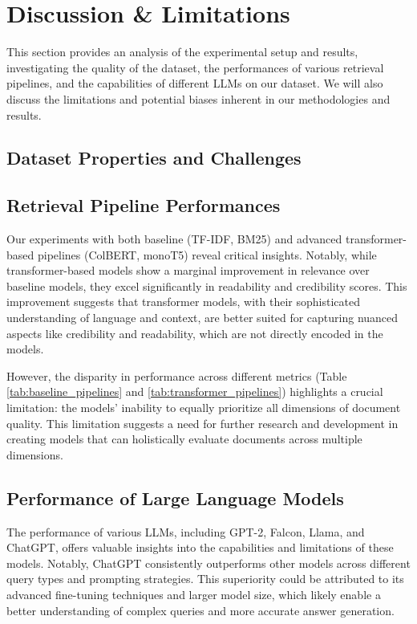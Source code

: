 \chapter{Discussion \& Limitations}

This section provides an analysis of the experimental setup and results, investigating the quality of the dataset, the performances of various retrieval pipelines, and the capabilities of different LLMs on our dataset.
We will also discuss the limitations and potential biases inherent in our methodologies and results.
\section{Dataset Properties and Challenges}

\section{Retrieval Pipeline Performances}
Our experiments with both baseline (TF-IDF, BM25) and advanced transformer-based pipelines (ColBERT, monoT5) reveal critical insights. Notably, while transformer-based models show a marginal improvement in relevance over baseline models, they excel significantly in readability and credibility scores. This improvement suggests that transformer models, with their sophisticated understanding of language and context, are better suited for capturing nuanced aspects like credibility and readability, which are not directly encoded in the models.

However, the disparity in performance across different metrics (Table \ref{tab:baseline_pipelines} and \ref{tab:transformer_pipelines}) highlights a crucial limitation: the models' inability to equally prioritize all dimensions of document quality. This limitation suggests a need for further research and development in creating models that can holistically evaluate documents across multiple dimensions.

\section{Performance of Large Language Models}
The performance of various LLMs, including GPT-2, Falcon, Llama, and ChatGPT, offers valuable insights into the capabilities and limitations of these models. Notably, ChatGPT consistently outperforms other models across different query types and prompting strategies. This superiority could be attributed to its advanced fine-tuning techniques and larger model size, which likely enable a better understanding of complex queries and more accurate answer generation.

